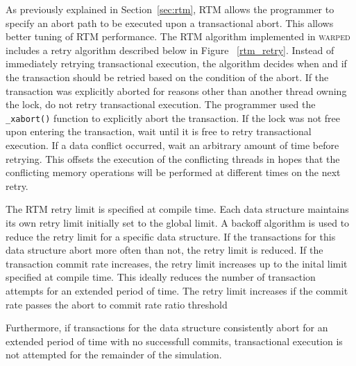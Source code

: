 \documentclass[11pt]{book}
\begin{document}
As previously explained in Section~\ref{sec:rtm}, RTM allows the programmer to specify an
abort path to be executed upon a transactional abort.  This allows better tuning of RTM
performance.  The RTM algorithm implemented in \textsc{warped} includes a retry algorithm described
below in Figure ~\ref{rtm_retry}. Instead of immediately retrying transactional execution,
the algorithm decides when and if the transaction should be retried based on the condition
of the abort.  If the transaction was explicitly aborted for reasons other than another
thread owning the lock, do not retry transactional execution.  The programmer used the
\texttt{\_xabort()} function to explicitly abort the transaction. If the lock was not free
upon entering the transaction, wait until it is free to retry transactional execution.  If
a data conflict occurred, wait an arbitrary amount of time before retrying.  This offsets
the execution of the conflicting threads in hopes that the conflicting memory operations
will be performed at different times on the next retry.

The RTM retry limit is specified at compile time.  Each data structure maintains its own
retry limit initially set to the global limit.  A backoff algorithm is used to reduce the
retry limit for a specific data structure.  If the transactions for this data structure
abort more often than not, the retry limit is reduced.  If the transaction
commit rate increases, the retry limit increases up to the inital limit
specified at compile time.  This ideally reduces the number of transaction
attempts for an extended period of time.  The retry limit increases if the
commit rate passes the abort to commit rate ratio threshold

Furthermore, if transactions for the data structure consistently abort for an extended
period of time with no successfull commits, transactional execution is not attempted for
the remainder of the simulation.
\end{document}
